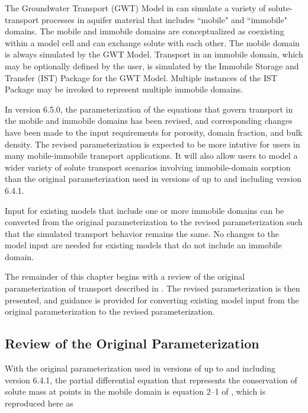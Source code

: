 
The Groundwater Transport (GWT) Model \citep{modflow6gwt} in \mf can simulate a variety of solute-transport processes in aquifer material that includes ``mobile" and ``immobile" domains. The mobile and immobile domains are conceptualized as coexisting within a model cell and can exchange solute with each other. The mobile domain is always simulated by the GWT Model.  Transport in an immobile domain, which may be optionally defined by the user, is simulated by the Immobile Storage and Transfer (IST) Package \citep{modflow6gwt} for the GWT Model. Multiple instances of the IST Package may be invoked to represent multiple immobile domains.

In \mf version 6.5.0, the parameterization of the equations that govern transport in the mobile and immobile domains has been revised, and corresponding changes have been made to the input requirements for porosity, domain fraction, and bulk density. The revised parameterization is expected to be more intutive for users in many mobile-immobile transport applications. It will also allow users to model a wider variety of solute transport scenarios involving immobile-domain sorption than the original parameterization used in versions of \mf up to and including version 6.4.1.

Input for existing \mf models that include one or more immobile domains can be converted from the original parameterization to the revised parameterization such that the simulated transport behavior remains the same. No changes to the model input are needed for existing \mf models that do not include an immobile domain.

The remainder of this chapter begins with a review of the original parameterization of transport described in \citep{modflow6gwt}. The revised parameterization is then presented, and guidance is provided for converting existing model input from the original parameterization to the revised parameterization.

\subsection{Review of the Original Parameterization} \label{sec:origparamreview}

With the original parameterization used in versions of \mf up to and including version 6.4.1, the partial differential equation that represents the conservation of solute mass at points in the mobile domain is equation 2--1 of \cite{modflow6gwt}, which is reproduced here as

